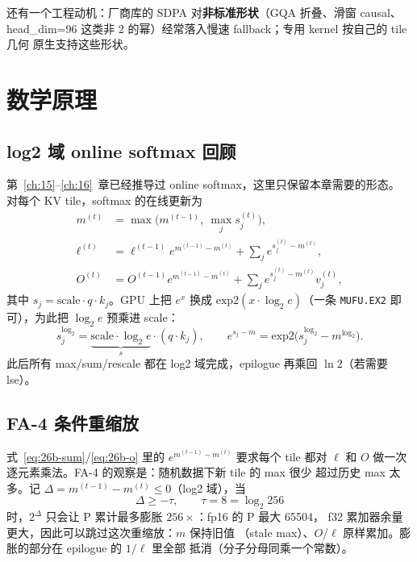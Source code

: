 还有一个工程动机：厂商库的 SDPA 对\textbf{非标准形状}（GQA 折叠、滑窗 causal、
head\_dim=96 这类非 2 的幂）经常落入慢速 fallback；专用 kernel 按自己的 tile 几何
原生支持这些形状。

\section{数学原理}\label{sec:26b-math}

\subsection{log2 域 online softmax 回顾}

第~\ref{ch:15}--\ref{ch:16}~章已经推导过 online softmax，这里只保留本章需要的形态。
对每个 KV tile，softmax 的在线更新为
\begin{align}
  m^{(t)} &= \max\!\big(m^{(t-1)},\ \max_j s_j^{(t)}\big), \label{eq:26b-max}\\
  \ell^{(t)} &= \ell^{(t-1)} e^{m^{(t-1)}-m^{(t)}} + \sum_j e^{s_j^{(t)}-m^{(t)}}, \label{eq:26b-sum}\\
  O^{(t)} &= O^{(t-1)} e^{m^{(t-1)}-m^{(t)}} + \sum_j e^{s_j^{(t)}-m^{(t)}} v_j^{(t)}, \label{eq:26b-o}
\end{align}
其中 $s_j = \text{scale}\cdot q\cdot k_j$。GPU 上把 $e^x$ 换成
$\mathrm{exp2}(x\cdot\log_2 e)$（一条 \texttt{MUFU.EX2} 即可），为此把
$\log_2 e$ 预乘进 scale：
\begin{equation}\label{eq:26b-log2domain}
  s_j^{\log_2} = \underbrace{\text{scale}\cdot\log_2 e}_{s}\cdot (q\cdot k_j),
  \qquad e^{s_j - m} = \mathrm{exp2}\!\big(s_j^{\log_2} - m^{\log_2}\big).
\end{equation}
此后所有 max/sum/rescale 都在 log2 域完成，epilogue 再乘回 $\ln 2$（若需要 lse）。

\subsection{FA-4 条件重缩放}

式~\eqref{eq:26b-sum}/\eqref{eq:26b-o} 里的 $e^{m^{(t-1)}-m^{(t)}}$ 要求每个 tile
都对 $\ell$ 和 $O$ 做一次逐元素乘法。FA-4 的观察是：随机数据下新 tile 的 max 很少
超过历史 max 太多。记 $\Delta = m^{(t-1)} - m^{(t)} \le 0$（log2 域），当
\begin{equation}\label{eq:26b-fa4}
  \Delta \ge -\tau, \qquad \tau = 8 = \log_2 256
\end{equation}
时，$2^{\Delta}$ 只会让 P 累计最多膨胀 $256\times$：fp16 的 P 最大 65504，
f32 累加器余量更大，因此可以跳过这次重缩放：$m$ 保持旧值
（stale max）、$O$/$\ell$ 原样累加。膨胀的部分在 epilogue 的 $1/\ell$ 里全部
抵消（分子分母同乘一个常数）。

